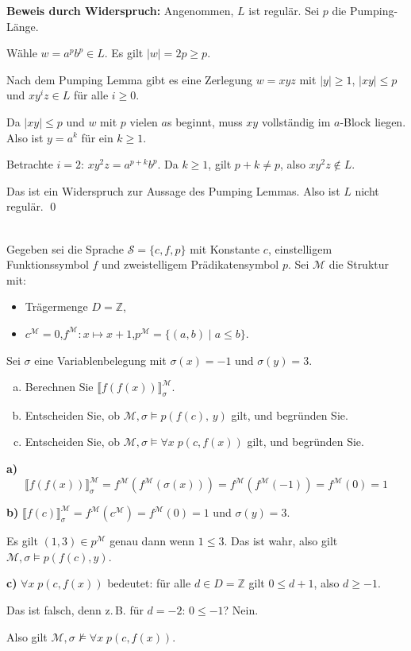 \begin{loesung}
\textbf{Beweis durch Widerspruch:} Angenommen, $L$ ist regulär. Sei $p$ die Pumping-Länge.

Wähle $w = a^p b^p \in L$. Es gilt $|w| = 2p \geq p$.

Nach dem Pumping Lemma gibt es eine Zerlegung $w = xyz$ mit $|y|\geq 1$, $|xy|\leq p$ und $xy^iz\in L$ für alle $i\geq 0$.

Da $|xy|\leq p$ und $w$ mit $p$ vielen $a$s beginnt, muss $xy$ vollständig im $a$-Block liegen. Also ist $y = a^k$ für ein $k\geq 1$.

Betrachte $i=2$: $xy^2z = a^{p+k}b^p$. Da $k\geq 1$, gilt $p+k\neq p$, also $xy^2z\notin L$.

Das ist ein Widerspruch zur Aussage des Pumping Lemmas. Also ist $L$ nicht regulär. \qed
\end{loesung}

\\
Gegeben sei die Sprache $\mathcal{S} = \{c, f, p\}$ mit Konstante $c$, einstelligem Funktionssymbol $f$ und zweistelligem Prädikatensymbol $p$. Sei $\mathcal{M}$ die Struktur mit:
\begin{itemize}
  \item Trägermenge $D = \mathbb{Z}$,
  \item $c^\mathcal{M} = 0$,\quad $f^\mathcal{M}: x \mapsto x + 1$,\quad $p^\mathcal{M} = \{(a,b) \mid a \leq b\}$.
\end{itemize}
Sei $\sigma$ eine Variablenbelegung mit $\sigma(x) = -1$ und $\sigma(y) = 3$.
\begin{enumerate}[a)]
  \item Berechnen Sie $\llbracket f(f(x)) \rrbracket^\mathcal{M}_\sigma$.
  \item Entscheiden Sie, ob $\mathcal{M}, \sigma \models p(f(c),\, y)$ gilt, und begründen Sie.
  \item Entscheiden Sie, ob $\mathcal{M}, \sigma \models \forall x\; p(c, f(x))$ gilt, und begründen Sie.
\end{enumerate}

\begin{loesung}
\textbf{a)}
\[
  \llbracket f(f(x))\rrbracket^\mathcal{M}_\sigma = f^\mathcal{M}(f^\mathcal{M}(\sigma(x))) = f^\mathcal{M}(f^\mathcal{M}(-1)) = f^\mathcal{M}(0) = 1
\]

\textbf{b)} $\llbracket f(c)\rrbracket^\mathcal{M}_\sigma = f^\mathcal{M}(c^\mathcal{M}) = f^\mathcal{M}(0) = 1$ und $\sigma(y)=3$.

Es gilt $(1,3)\in p^\mathcal{M}$ genau dann wenn $1\leq 3$. Das ist wahr, also gilt $\mathcal{M},\sigma\models p(f(c),y)$.

\textbf{c)} $\forall x\;p(c,f(x))$ bedeutet: für alle $d\in D=\mathbb{Z}$ gilt $0\leq d+1$, also $d\geq -1$.

Das ist falsch, denn z.\,B. für $d=-2$: $0\leq -1$? Nein.

Also gilt $\mathcal{M},\sigma\not\models\forall x\;p(c,f(x))$.
\end{loesung}

